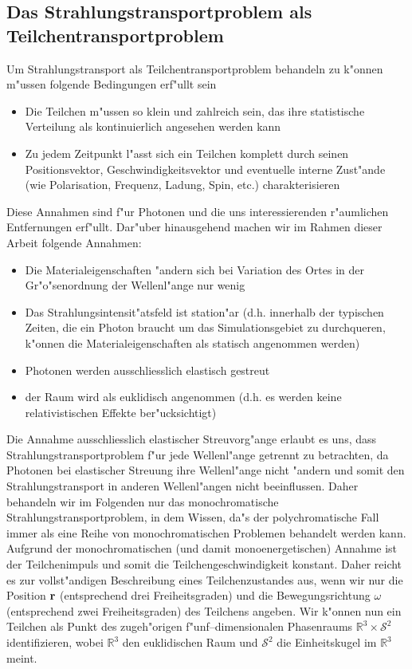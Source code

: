 \documentclass[11pt,a4paper,DIVcalc,BCOR8mm,titlepage,twoside]{scrartcl}
\begin{document}
	\subsection{Das Strahlungstransportproblem als Teilchentransportproblem}
	Um Strahlungstransport als Teilchentransportproblem behandeln zu k"onnen m"ussen folgende Bedingungen erf"ullt sein
	\begin{itemize}
		\item{Die Teilchen m"ussen so klein und zahlreich sein, das ihre statistische Verteilung als kontinuierlich angesehen werden kann}
		\item{Zu jedem Zeitpunkt l"asst sich ein Teilchen komplett durch seinen Positionsvektor, Geschwindigkeitsvektor und eventuelle interne Zust"ande (wie Polarisation, Frequenz, Ladung, Spin, etc.) charakterisieren}
	\end{itemize}
	Diese Annahmen sind f"ur Photonen und die uns interessierenden r"aumlichen Entfernungen erf"ullt.
	Dar"uber hinausgehend machen wir im Rahmen dieser Arbeit folgende Annahmen:
	\begin{itemize}
		\item{Die Materialeigenschaften "andern sich bei Variation des Ortes in der Gr"o"senordnung der Wellenl"ange nur wenig}
		\item{Das Strahlungsintensit"atsfeld ist station"ar (d.h. innerhalb der typischen Zeiten, die ein Photon braucht um das Simulationsgebiet zu durchqueren, k"onnen die Materialeigenschaften als statisch angenommen werden)}
		\item{Photonen werden ausschliesslich elastisch gestreut}
		\item{der Raum wird als euklidisch angenommen (d.h. es werden keine relativistischen Effekte ber"ucksichtigt)}
	\end{itemize}
	Die Annahme ausschliesslich elastischer Streuvorg"ange erlaubt es uns, dass Strahlungstransportproblem f"ur jede Wellenl"ange getrennt zu betrachten, da Photonen bei elastischer Streuung ihre Wellenl"ange nicht "andern und somit den Strahlungstransport in anderen Wellenl"angen nicht beeinflussen. Daher behandeln wir im Folgenden nur das monochromatische Strahlungstransportproblem, in dem Wissen, da"s der polychromatische Fall immer als eine Reihe von monochromatischen Problemen behandelt werden kann. Aufgrund der monochromatischen (und damit monoenergetischen) Annahme ist der Teilchenimpuls und somit die Teilchengeschwindigkeit konstant. Daher reicht es zur vollst"andigen Beschreibung eines Teilchenzustandes aus, wenn wir nur die Position $\mathbf{r}$ (entsprechend drei Freiheitsgraden) und die Bewegungsrichtung $\omega$ (entsprechend zwei Freiheitsgraden) des Teilchens angeben. Wir k"onnen nun ein Teilchen als Punkt des zugeh"origen f"unf--dimensionalen Phasenraums $\mathbb{R}^3 \times \mathcal{S}^2$ identifizieren, wobei $\mathbb{R}^3$ den euklidischen Raum und $\mathcal{S}^2$ die Einheitskugel im $\mathbb{R}^3$ meint.
	
\end{document}
